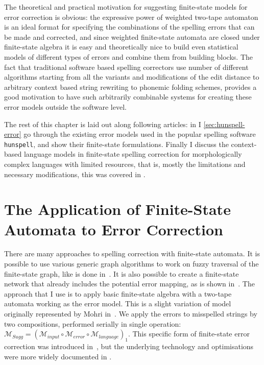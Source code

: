 \documentclass[officiallayout]{unihelcompling}
\begin{document}
The theoretical and practical motivation for suggesting finite-state models for
error correction is obvious: the expressive power of weighted two-tape 
automaton is an ideal format for specifying the combinations of the
spelling errors that can be made and corrected, and since weighted
finite-state automata are closed under finite-state algebra it is easy
and theoretically nice to build even statistical models of different types
of errors and combine them from building blocks. The fact that traditional
software based spelling correctors use number of different algorithms starting
from all the variants and modifications of the edit distance to arbitrary
context based string rewriting to phonemic folding schemes, provides a good
motivation to have such arbitrarily combinable systems for creating these
error models outside the software level.

The rest of this chapter is laid out along following articles: in I
\ref{sec:hunspell-error} go through the existing error models used in the
popular spelling software \texttt{hunspell}, and show their finite-state
formulations.  Finally I discuss the context-based language models in
finite-state spelling correction for morphologically complex languages with
limited resources, that is, mostly the limitations and necessary modifications,
this was covered in \citep{pirinen2012improving}.

\section{The Application of Finite-State Automata to Error Correction}

There are many approaches to spelling correction with finite-state automata.
It is possible to use various generic graph algorithms to work on fuzzy
traversal of the finite-state graph, like is done in~\citep{hulden2009fast}.  It
is also possible to create a finite-state network that already includes the
potential error mapping, as is shown in~\citep{schulz2002fast}. The approach
that I use is to apply basic finite-state algebra with a two-tape automata
working as the error model. This is a slight variation of model originally
represented by Mohri in~\citep{mohri2003edit}. We apply the errors to misspelled
strings by two compositions, performed serially in single operation:
$\mathcal{M}_{Sugg} = (\mathcal{M}_{input} \circ \mathcal{M}_{error} \circ
\mathcal{M}_{language})_1$.  This specific form of finite-state error
correction was introduced in~\citep{pirinen2010finitestate}, but the underlying
technology and optimisations were more widely documented in
\citep{linden2011hfst}.
\end{document}
